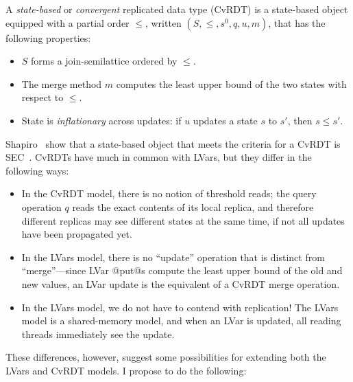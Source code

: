 \documentclass{article}
\begin{document}
A \emph{state-based} or \emph{convergent} replicated data type (CvRDT)
is a state-based object equipped with a partial order $\leq$, written
$(S, \leq, s^0, q, u, m)$, that has the following properties:
\begin{itemize}
\item $S$ forms a join-semilattice ordered by $\leq$.
\item The merge method $m$ computes the least upper bound of the two
  states with respect to $\leq$.
\item State is \emph{inflationary} across updates: if $u$ updates a
  state $s$ to $s'$, then $s \leq s'$.
\end{itemize}
Shapiro \etal~show that a state-based object that meets the criteria
for a CvRDT is SEC~\cite{crdts}.  CvRDTs have much in common with
LVars, but they differ in the following ways:
\begin{itemize}
\item In the CvRDT model, there is no notion of threshold reads; the
  query operation $q$ reads the exact contents of its local replica,
  and therefore different replicas may see different states at the
  same time, if not all updates have been propagated yet.
\item In the LVars model, there is no ``update'' operation that is
  distinct from ``merge''---since LVar @put@s compute the least upper
  bound of the old and new values, an LVar update is the equivalent of
  a CvRDT merge operation.
\item In the LVars model, we do not have to contend with replication!
  The LVars model is a shared-memory model, and when an LVar is
  updated, all reading threads immediately see the update.
\end{itemize}
These differences, however, suggest some possibilities for extending
both the LVars and CvRDT models.  I propose to do the following:
\end{document}
